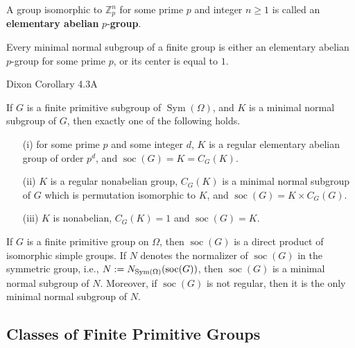 \begin{definition}
	A group isomorphic to $\mathbb{Z}_p^n$ for some prime $p$ and integer $n\geq1$ is called an \textbf{elementary abelian} $p$-\textbf{group}.
\end{definition}

\begin{corollary} \label{cor-minimal-normal-is-elem-abelian-p}
	Every minimal normal subgroup of a finite group is either an elementary abelian $p$-group for some prime $p$, or its center is equal to $1$.
\end{corollary}
\begin{sketch}
	Dixon Corollary 4.3A
\end{sketch}

\begin{theorem} \label{thm-minimal-normal-for-finite-primitive-grp}
	If $G$ is a finite primitive subgroup of $\operatorname{Sym}(\Omega)$, and $K$ is a minimal normal subgroup of $G$, then exactly one of the following holds.
	\begin{enumerate}
		\item[(i)] for some prime $p$ and some integer $d$, $K$ is a regular elementary abelian group of order $p^d$, and $\operatorname{soc}(G) = K = C_G(K)$.
		\item[(ii)] $K$ is a regular nonabelian group, $C_G(K)$ is a minimal normal subgroup of $G$ which is permutation isomorphic to $K$, and $\operatorname{soc}(G) = K \times C_G(G)$.
		\item[(iii)] $K$ is nonabelian, $C_G(K) = 1$ and $\operatorname{soc}(G) = K$.
	\end{enumerate}
\end{theorem}
\begin{corollary} \label{cor-socle-for-finite-primitive-grp}
	If $G$ is a finite primitive group on $\Omega$, then $\operatorname{soc}(G)$ is a direct product of isomorphic simple groups. If $N$ denotes the normalizer of $\operatorname{soc}(G)$ in the symmetric group, i.e., $N:=N_{\operatorname{Sym}(\Omega)}(\operatorname{soc}(G))$, then $\operatorname{soc}(G)$ is a minimal normal subgroup of $N$. Moreover, if $\operatorname{soc}(G)$ is not regular, then it is the only minimal normal subgroup of $N$.
\end{corollary}

\subsection{Classes of Finite Primitive Groups} \label{sec-classes-of-grps}


